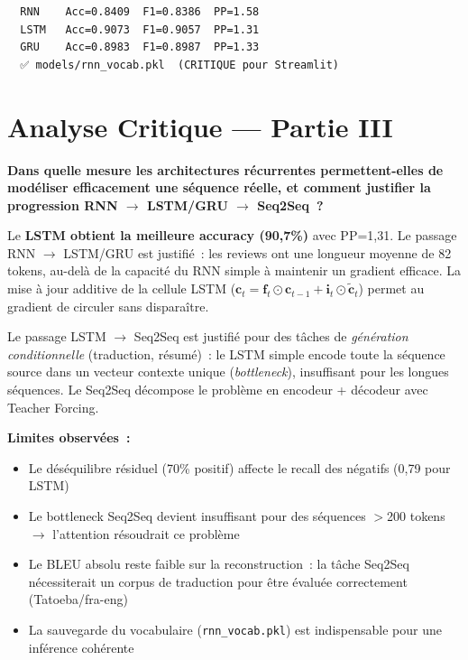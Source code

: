 \documentclass[12pt,a4paper]{report}
\begin{document}
\begin{outputbox}
\begin{verbatim}
  RNN    Acc=0.8409  F1=0.8386  PP=1.58
  LSTM   Acc=0.9073  F1=0.9057  PP=1.31
  GRU    Acc=0.8983  F1=0.8987  PP=1.33
  ✅ models/rnn_vocab.pkl  (CRITIQUE pour Streamlit)
\end{verbatim}
\end{outputbox}

\section{Analyse Critique --- Partie III}

\begin{infobox}
\textbf{Dans quelle mesure les architectures récurrentes permettent-elles de modéliser
efficacement une séquence réelle, et comment justifier la progression RNN $\to$ LSTM/GRU
$\to$ Seq2Seq~?}

\medskip
Le \textbf{LSTM obtient la meilleure accuracy (90,7\%)} avec PP=1,31.
Le passage RNN $\to$ LSTM/GRU est justifié~: les reviews ont une longueur moyenne de
82 tokens, au-delà de la capacité du RNN simple à maintenir un gradient efficace. La
mise à jour additive de la cellule LSTM ($\mathbf{c}_t = \mathbf{f}_t\odot\mathbf{c}_{t-1}
+ \mathbf{i}_t\odot\tilde{\mathbf{c}}_t$) permet au gradient de circuler sans disparaître.

\medskip Le passage LSTM $\to$ Seq2Seq est justifié pour des tâches de \textit{génération
conditionnelle} (traduction, résumé)~: le LSTM simple encode toute la séquence source dans
un vecteur contexte unique (\textit{bottleneck}), insuffisant pour les longues séquences. 
Le Seq2Seq décompose le problème en encodeur + décodeur avec Teacher Forcing.

\medskip\textbf{Limites observées~:}
\begin{itemize}[leftmargin=*,nosep]
  \item Le déséquilibre résiduel (70\% positif) affecte le recall des négatifs (0,79 pour LSTM)
  \item Le bottleneck Seq2Seq devient insuffisant pour des séquences $>$200 tokens $\to$ l'attention résoudrait ce problème
  \item Le BLEU absolu reste faible sur la reconstruction~: la tâche Seq2Seq nécessiterait un corpus de traduction pour être évaluée correctement (Tatoeba/fra-eng)
  \item La sauvegarde du vocabulaire (\texttt{rnn\_vocab.pkl}) est indispensable pour une inférence cohérente
\end{itemize}
\end{infobox}
\end{document}
